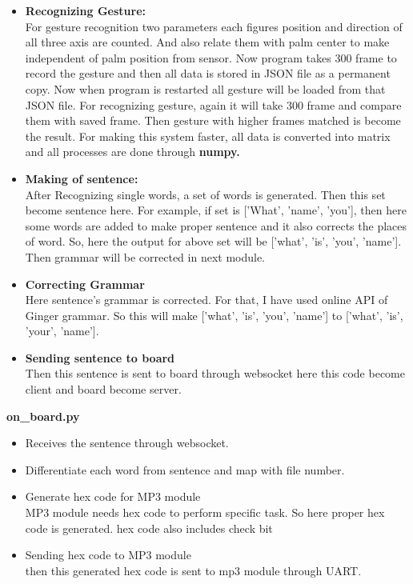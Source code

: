 \documentclass[a4paper,12pt,oneside]{book}
\begin{document}
\begin{itemize}
\item \textbf{Recognizing Gesture:}\\
For gesture recognition two parameters each figures position and direction of all three axis are counted. And also relate them with palm center to make independent of palm position from sensor. Now program takes 300 frame to record the gesture and then all data is stored in JSON file as a permanent copy. Now when program is restarted all gesture will be loaded from that JSON file. For recognizing gesture, again it will take 300 frame and compare them with saved frame. Then gesture with higher frames matched is become  the result. For making this system faster, all data is converted into matrix and all processes are done through \textbf{numpy.} 
\item \textbf{Making of sentence:}\\
After Recognizing single words, a set of words is generated. Then this set become sentence here. For example, if set is ['What', 'name', 'you'], then here some words are added to make proper sentence and it also corrects the places of word. So, here the output for above set will be ['what', 'is', 'you', 'name']. Then grammar will be corrected in next module.
\item \textbf{Correcting Grammar}\\
Here sentence's grammar is corrected. For that, I have used online API of Ginger grammar. So this will make ['what', 'is', 'you', 'name'] to ['what', 'is', 'your', 'name'].
\item \textbf{Sending sentence to board}\\
Then this sentence is sent to board through websocket here this code become client and board become server.
\end{itemize}
\textbf{\Large{on\_board.py}}
\begin{itemize}
\item Receives the sentence through websocket.
\item Differentiate each word from sentence and map with file number.
\item Generate hex code for MP3 module\\
MP3 module needs hex code to perform specific task. So here proper hex code is generated. hex code also includes check bit
\item Sending hex code to MP3 module\\
then this generated hex code is sent to mp3 module through UART.
\end{itemize}
\end{document}
